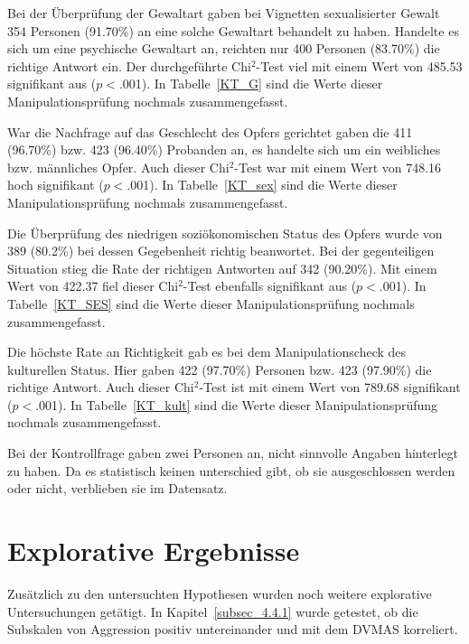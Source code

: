 

Bei der Überprüfung der Gewaltart gaben bei Vignetten sexualisierter Gewalt 354 Personen (91.70\%) an eine solche Gewaltart behandelt zu haben. Handelte es sich um eine psychische Gewaltart an, reichten nur 400 Personen (83.70\%) die richtige Antwort ein. Der durchgeführte Chi$^2$-Test viel mit einem Wert von 485.53 signifikant aus ($p<$.001). 
In Tabelle~\ref{KT_G} sind die Werte dieser Manipulationsprüfung nochmals zusammengefasst.

War die Nachfrage auf das Geschlecht des Opfers gerichtet gaben die 411 (96.70\%) bzw. 423 (96.40\%) Probanden an, es handelte sich um ein weibliches bzw. männliches Opfer. Auch dieser Chi$^2$-Test war mit einem Wert von 748.16 hoch signifikant ($p<$.001). 
In Tabelle~\ref{KT_sex} sind die Werte dieser Manipulationsprüfung nochmals zusammengefasst.

Die Überprüfung des niedrigen soziökonomischen Status des Opfers wurde von 389 (80.2\%) bei dessen Gegebenheit richtig beanwortet. Bei der gegenteiligen Situation stieg die Rate der richtigen Antworten auf 342 (90.20\%). Mit einem Wert von 422.37 fiel dieser Chi$^2$-Test ebenfalls signifikant aus ($p<$.001). 
In Tabelle~\ref{KT_SES} sind die Werte dieser Manipulationsprüfung nochmals zusammengefasst.



Die höchste Rate an Richtigkeit gab es bei dem Manipulationscheck des kulturellen Status. Hier gaben 422 (97.70\%) Personen bzw. 423 (97.90\%) die richtige Antwort. Auch dieser Chi$^2$-Test ist mit einem Wert von 789.68 signifikant ($p<$.001). 
In Tabelle~\ref{KT_kult} sind die Werte dieser Manipulationsprüfung nochmals zusammengefasst.

Bei der Kontrollfrage gaben zwei Personen an, nicht sinnvolle Angaben hinterlegt zu haben. Da es statistisch keinen unterschied gibt, ob sie ausgeschlossen werden oder nicht, verblieben sie im Datensatz.


\section{Explorative Ergebnisse}    \label{sec_4.4}
Zusätzlich zu den untersuchten Hypothesen wurden noch weitere explorative Untersuchungen getätigt. In Kapitel~\ref{subsec_4.4.1} wurde getestet, ob die Subskalen von Aggression positiv untereinander und mit dem DVMAS korreliert. 

